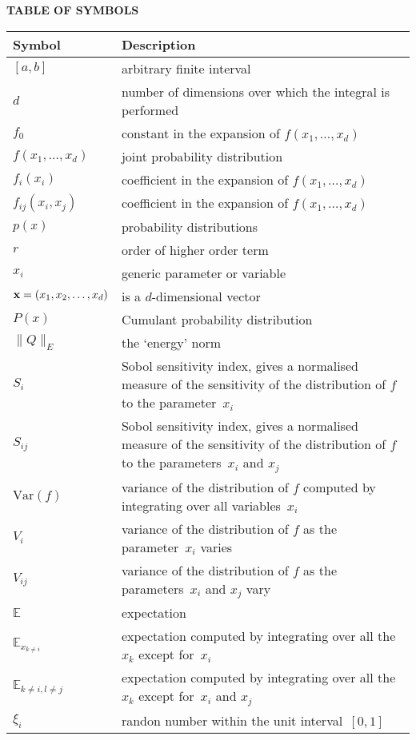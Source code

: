 \begin{table}[h]
\textbf{\textsf{TABLE OF SYMBOLS}}
\begin{center}
\begin{tabular}{|p{4.0cm}|p{12.0cm}|}
\hline
\textbf{\textsf{Symbol}}
& \textbf{\textsf{Description}} \\
\hline
$[a,b]$ & arbitrary finite interval \\
$d$ & number of dimensions over which the integral is performed \\
$f_0$ & constant in the expansion of $f\left(x_1,\ldots,x_d\right)$ \\
$f\left(x_1,\ldots,x_d\right)$ & joint probability distribution \\
$f_i(x_i)$ & coefficient in the expansion of $f\left(x_1,\ldots,x_d\right)$ \\
$f_{ij}(x_i,x_j)$ & coefficient in the expansion of $f\left(x_1,\ldots,x_d\right)$ \\
$p(x)$ & probability distributions  \\
$r$ & order of higher order term \\
$x_i$ & generic parameter or variable \\ 
${\bf x}=\left(x_1,x_2,\dots,x_d\right)$ & is a $d$-dimensional vector \\
$P(x)$ & Cumulant probability distribution \\
$\parallel  Q \parallel_E $ &the `energy' norm \\
$S_i$ & Sobol sensitivity index, gives a normalised measure of the sensitivity of the distribution of $f$ to the parameter~$x_i$ \\
$S_{ij}$ & Sobol sensitivity index, gives a normalised measure of the sensitivity of the distribution of $f$ to the parameters~$x_i$ and $x_j$ \\
$\mathrm{Var}(f)$ & variance of the distribution of $f$ computed by integrating over all variables~$x_i$ \\
$V_i$ & variance of the distribution of $f$ as the parameter~$x_i$ varies \\
$V_{ij}$ & variance of the distribution of $f$ as the parameters~$x_i$ and $x_j$ vary \\
$\mathbb{E}$ & expectation \\
$\mathbb{E}_{x_{k\neq i}}$ & expectation computed by integrating over all the $x_k$ except for~$x_i$ \\
$\mathbb{E}_{k\neq i, l\neq j}$ & expectation computed by integrating over all the $x_k$ except for~$x_i$ and  $x_j$ \\
$\xi_i$ & randon number within the unit interval~$[0,1]$ \\
\hline
\end{tabular}
\end{center}
\end{table}
